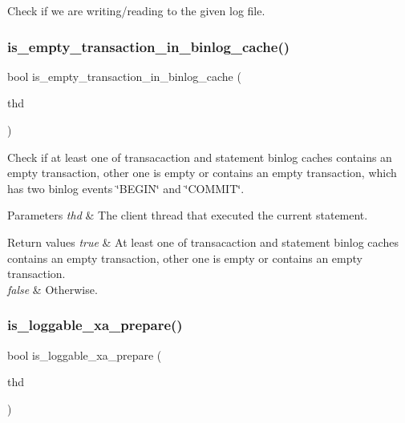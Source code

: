 Check if we are writing/reading to the given log file. \mbox{\label{group__Binary__Log_ga47165cf06d3f64979787a85b6b43f3ac}} 
\subsubsection{\texorpdfstring{is\+\_\+empty\+\_\+transaction\+\_\+in\+\_\+binlog\+\_\+cache()}{is\_empty\_transaction\_in\_binlog\_cache()}}
{\footnotesize\ttfamily bool is\+\_\+empty\+\_\+transaction\+\_\+in\+\_\+binlog\+\_\+cache (\begin{DoxyParamCaption}\item[{const T\+HD $\ast$}]{thd }\end{DoxyParamCaption})}

Check if at least one of transacaction and statement binlog caches contains an empty transaction, other one is empty or contains an empty transaction, which has two binlog events \char`\"{}\+B\+E\+G\+I\+N\char`\"{} and \char`\"{}\+C\+O\+M\+M\+I\+T\char`\"{}.


\begin{DoxyParams}{Parameters}
{\em thd} & The client thread that executed the current statement.\\
\hline
\end{DoxyParams}

\begin{DoxyRetVals}{Return values}
{\em true} & At least one of transacaction and statement binlog caches contains an empty transaction, other one is empty or contains an empty transaction. \\
\hline
{\em false} & Otherwise. \\
\hline
\end{DoxyRetVals}
\mbox{\label{group__Binary__Log_ga0f5702b2bc03f66bc0a37c05ff1c84e8}} 
\subsubsection{\texorpdfstring{is\+\_\+loggable\+\_\+xa\+\_\+prepare()}{is\_loggable\_xa\_prepare()}}
{\footnotesize\ttfamily bool is\+\_\+loggable\+\_\+xa\+\_\+prepare (\begin{DoxyParamCaption}\item[{T\+HD $\ast$}]{thd }\end{DoxyParamCaption})\hspace{0.3cm}{\ttfamily [inline]}}

